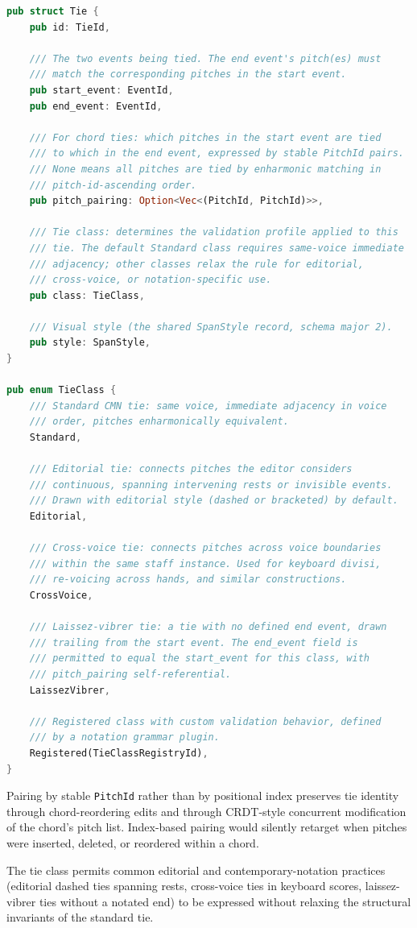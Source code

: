\documentclass[11pt,letterpaper]{report}
\begin{document}
\begin{lstlisting}[language=Rust]
pub struct Tie {
    pub id: TieId,

    /// The two events being tied. The end event's pitch(es) must
    /// match the corresponding pitches in the start event.
    pub start_event: EventId,
    pub end_event: EventId,

    /// For chord ties: which pitches in the start event are tied
    /// to which in the end event, expressed by stable PitchId pairs.
    /// None means all pitches are tied by enharmonic matching in
    /// pitch-id-ascending order.
    pub pitch_pairing: Option<Vec<(PitchId, PitchId)>>,

    /// Tie class: determines the validation profile applied to this
    /// tie. The default Standard class requires same-voice immediate
    /// adjacency; other classes relax the rule for editorial,
    /// cross-voice, or notation-specific use.
    pub class: TieClass,

    /// Visual style (the shared SpanStyle record, schema major 2).
    pub style: SpanStyle,
}

pub enum TieClass {
    /// Standard CMN tie: same voice, immediate adjacency in voice
    /// order, pitches enharmonically equivalent.
    Standard,

    /// Editorial tie: connects pitches the editor considers
    /// continuous, spanning intervening rests or invisible events.
    /// Drawn with editorial style (dashed or bracketed) by default.
    Editorial,

    /// Cross-voice tie: connects pitches across voice boundaries
    /// within the same staff instance. Used for keyboard divisi,
    /// re-voicing across hands, and similar constructions.
    CrossVoice,

    /// Laissez-vibrer tie: a tie with no defined end event, drawn
    /// trailing from the start event. The end_event field is
    /// permitted to equal the start_event for this class, with
    /// pitch_pairing self-referential.
    LaissezVibrer,

    /// Registered class with custom validation behavior, defined
    /// by a notation grammar plugin.
    Registered(TieClassRegistryId),
}
\end{lstlisting}

\begin{rationale}
  Pairing by stable \texttt{PitchId} rather than by positional index
  preserves tie identity through chord-reordering edits and through
  CRDT-style concurrent modification of the chord's pitch list.
  Index-based pairing would silently retarget when pitches were
  inserted, deleted, or reordered within a chord.

  The tie class permits common editorial and contemporary-notation
  practices (editorial dashed ties spanning rests, cross-voice ties
  in keyboard scores, laissez-vibrer ties without a notated end) to
  be expressed without relaxing the structural invariants of the
  standard tie.
\end{rationale}
\end{document}
